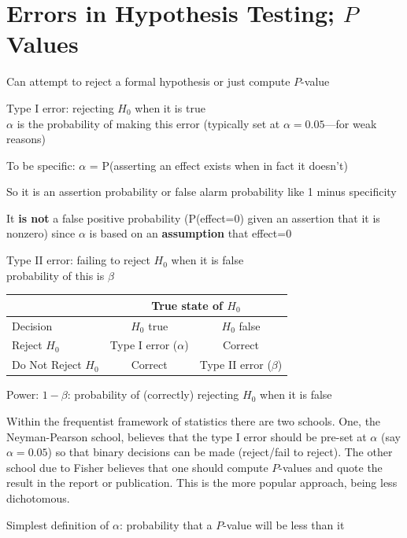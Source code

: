 \section{Errors in Hypothesis Testing; $P$ Values} 
\bi
\item Can attempt to reject a formal hypothesis or just compute
  $P$-value
\item Type I error: rejecting $H_0$ when it is true \\
  $\alpha$ is the probability of making this error (typically set at
  $\alpha=0.05$---for weak reasons)
  \bi
  \item To be specific: $\alpha$ = P(asserting an
    effect exists when in fact it doesn't)
  \item So it is an assertion probability or false alarm probability
    like 1 minus specificity
  \item It \textbf{is not} a false positive probability (P(effect=0)
    given an assertion that it is nonzero) since $\alpha$ is based on
    an \textbf{assumption} that effect=0
  \ei
\item Type II error: failing to reject $H_0$ when it is false \\
  probability of this is $\beta$
\begin{center}
\begin{tabular}{|l||c|c|} \hline
 & \multicolumn{2}{|c|}{True state of $H_0$} \\ \hline 
Decision & $H_0$ true & $H_0$ false \\ \hline \hline
Reject $H_0$ & Type I error ($\alpha$) & Correct \\  \hline
Do Not Reject $H_0$ & Correct & Type II error ($\beta$) \\  \hline
\end{tabular}
\end{center}

\item Power: $1 - \beta$: probability of (correctly) rejecting $H_0$
  when it is false
\ei

Within the frequentist framework of statistics there are two schools.
One, the Neyman-Pearson school, believes that the type I error should
be pre-set at $\alpha$ (say $\alpha=0.05$) so that binary decisions
can be made (reject/fail to reject).  The other school due to Fisher
believes that one should compute $P$-values and quote the result in
the report or publication.  This is the more popular approach, being less dichotomous.

\bi
  \item Simplest definition of $\alpha$: probability that a $P$-value
    will be less than it
\ei


